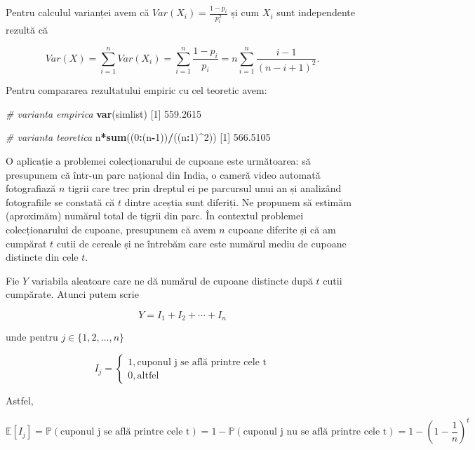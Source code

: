 \documentclass[]{article}
\newenvironment{Shaded}{\begin{snugshade}}{\end{snugshade}}
\newcommand{\KeywordTok}[1]{\textcolor[rgb]{0.13,0.29,0.53}{\textbf{#1}}}
\newcommand{\DecValTok}[1]{\textcolor[rgb]{0.00,0.00,0.81}{#1}}
\newcommand{\FloatTok}[1]{\textcolor[rgb]{0.00,0.00,0.81}{#1}}
\newcommand{\CommentTok}[1]{\textcolor[rgb]{0.56,0.35,0.01}{\textit{#1}}}
\newcommand{\OperatorTok}[1]{\textcolor[rgb]{0.81,0.36,0.00}{\textbf{#1}}}
\newcommand{\NormalTok}[1]{#1}
\begin{document}
Pentru calculul varianței avem că \(Var(X_i) = \frac{1-p_i}{p_i^2}\) și
cum \(X_i\) sunt independente rezultă că

\[
  Var(X) = \sum_{i = 1}^{n}Var(X_i) = \sum_{i = 1}^{n}\frac{1-p_i}{p_i} = n\sum_{i = 1}^{n}\frac{i-1}{(n-i+1)^2}.
\]

Pentru compararea rezultatului empiric cu cel teoretic avem:

\begin{Shaded}
\begin{Highlighting}[]
\CommentTok{# varianta empirica}
\KeywordTok{var}\NormalTok{(simlist)}
\NormalTok{[}\DecValTok{1}\NormalTok{] }\FloatTok{559.2615}

\CommentTok{# varianta teoretica}
\NormalTok{n}\OperatorTok{*}\KeywordTok{sum}\NormalTok{((}\DecValTok{0}\OperatorTok{:}\NormalTok{(n}\OperatorTok{-}\DecValTok{1}\NormalTok{))}\OperatorTok{/}\NormalTok{((n}\OperatorTok{:}\DecValTok{1}\NormalTok{)}\OperatorTok{^}\DecValTok{2}\NormalTok{))}
\NormalTok{[}\DecValTok{1}\NormalTok{] }\FloatTok{566.5105}
\end{Highlighting}
\end{Shaded}

O aplicație a problemei colecționarului de cupoane este următoarea: să
presupunem că într-un parc național din India, o cameră video automată
fotografiază \(n\) tigrii care trec prin dreptul ei pe parcursul unui an
și analizând fotografiile se constată că \(t\) dintre aceștia sunt
diferiți. Ne propunem să estimăm (aproximăm) numărul total de tigrii din
parc. În contextul problemei colecționarului de cupoane, presupunem că
avem \(n\) cupoane diferite și că am cumpărat \(t\) cutii de cereale și
ne întrebăm care este numărul mediu de cupoane distincte din cele \(t\).

Fie \(Y\) variabila aleatoare care ne dă numărul de cupoane distincte
după \(t\) cutii cumpărate. Atunci putem scrie

\[
  Y = I_1 + I_2 +\cdots+I_n
\]

unde pentru \(j \in\{1,2,\ldots,n\}\)

\[
  I_j = \left\{\begin{array}{ll}
          1, \text{cuponul j se află printre cele t}\\
          0, \text{altfel}
  \end{array}\right.
\]

Astfel,

\[
  \mathbb{E}[I_j] = \mathbb{P}(\text{cuponul j se află printre cele t}) = 1 - \mathbb{P}(\text{cuponul j nu se află printre cele t}) = 1 - \left(1 - \frac{1}{n}\right)^t
\]
\end{document}
